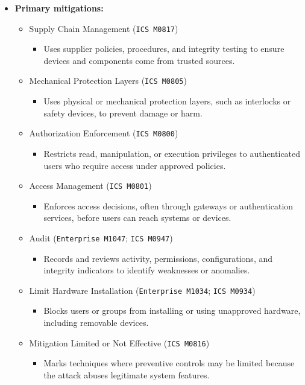 \documentclass[10pt,a4paper,oneside]{report}
\begin{document}
\begin{itemize}
\item \textbf{Primary mitigations:}
\begin{itemize}
\item Supply Chain Management (\texttt{ICS M0817})
\begin{itemize}
\item Uses supplier policies, procedures, and integrity testing to ensure devices and components come from trusted sources.
\end{itemize}
\item Mechanical Protection Layers (\texttt{ICS M0805})
\begin{itemize}
\item Uses physical or mechanical protection layers, such as interlocks or safety devices, to prevent damage or harm.
\end{itemize}
\item Authorization Enforcement (\texttt{ICS M0800})
\begin{itemize}
\item Restricts read, manipulation, or execution privileges to authenticated users who require access under approved policies.
\end{itemize}
\item Access Management (\texttt{ICS M0801})
\begin{itemize}
\item Enforces access decisions, often through gateways or authentication services, before users can reach systems or devices.
\end{itemize}
\item Audit (\texttt{Enterprise M1047}; \texttt{ICS M0947})
\begin{itemize}
\item Records and reviews activity, permissions, configurations, and integrity indicators to identify weaknesses or anomalies.
\end{itemize}
\item Limit Hardware Installation (\texttt{Enterprise M1034}; \texttt{ICS M0934})
\begin{itemize}
\item Blocks users or groups from installing or using unapproved hardware, including removable devices.
\end{itemize}
\item Mitigation Limited or Not Effective (\texttt{ICS M0816})
\begin{itemize}
\item Marks techniques where preventive controls may be limited because the attack abuses legitimate system features.
\end{itemize}
\end{itemize}
\end{itemize}
\end{document}
